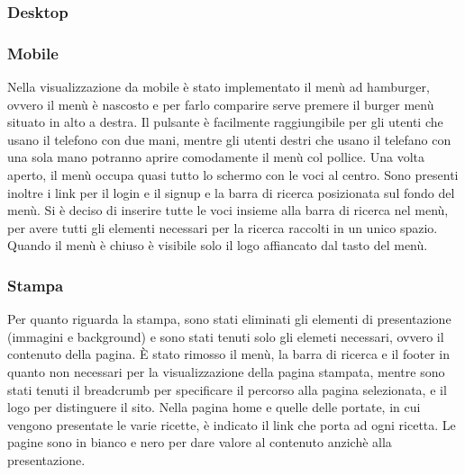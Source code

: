 \subsubsection{Desktop}
\label{ssub:desktop}

\subsubsection{Mobile}
\label{ssub:mobile}
Nella visualizzazione da mobile è stato implementato il menù ad hamburger, ovvero il menù è nascosto e per farlo comparire serve premere il burger menù situato in alto a destra. Il pulsante è facilmente raggiungibile per gli utenti che usano il telefono con due mani, mentre gli utenti destri che usano il telefano con una sola mano potranno aprire comodamente il menù col pollice.
Una volta aperto, il menù occupa quasi tutto lo schermo con le voci al centro. Sono presenti inoltre i link per il login e il signup e la barra di ricerca posizionata sul fondo del menù. Si è deciso di inserire tutte le voci insieme alla barra di ricerca nel menù, per avere tutti gli elementi necessari per la ricerca raccolti in un unico spazio. Quando il menù è chiuso è visibile solo il logo affiancato dal tasto del menù.


\subsubsection{Stampa}
\label{ssub:stampa}
Per quanto riguarda la stampa, sono stati eliminati gli elementi di presentazione (immagini e background) e sono stati tenuti solo gli elemeti necessari, ovvero il contenuto della pagina. È stato rimosso il menù, la barra di ricerca e il footer in quanto non necessari per la visualizzazione della pagina stampata, mentre sono stati tenuti il breadcrumb per specificare il percorso alla pagina selezionata, e il logo per distinguere il sito.
Nella pagina home e quelle delle portate, in cui vengono presentate le varie ricette, è indicato il link che porta ad ogni ricetta.
Le pagine sono in bianco e nero per dare valore al contenuto anzichè alla presentazione.
